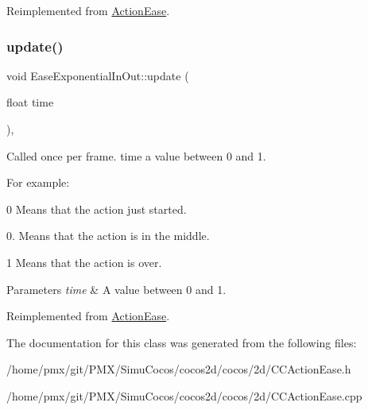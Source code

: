 Reimplemented from \hyperlink{classActionEase_ab99eb083fa033fae1d6c948fdc730782}{Action\+Ease}.

\mbox{\label{classEaseExponentialInOut_a856f7d0224d0ae8055b4a91a1538ce73}} 
\subsubsection{\texorpdfstring{update()}{update()}}
{\footnotesize\ttfamily void Ease\+Exponential\+In\+Out\+::update (\begin{DoxyParamCaption}\item[{float}]{time }\end{DoxyParamCaption})\hspace{0.3cm}{\ttfamily [override]}, {\ttfamily [virtual]}}

Called once per frame. time a value between 0 and 1.

For example\+:
\begin{DoxyItemize}
\item 0 Means that the action just started.
\item 0. Means that the action is in the middle.
\item 1 Means that the action is over.
\end{DoxyItemize}


\begin{DoxyParams}{Parameters}
{\em time} & A value between 0 and 1. \\
\hline
\end{DoxyParams}


Reimplemented from \hyperlink{classActionEase_a77679f09c02cf75fb54776470c339fc5}{Action\+Ease}.



The documentation for this class was generated from the following files\+:\begin{DoxyCompactItemize}
\item 
/home/pmx/git/\+P\+M\+X/\+Simu\+Cocos/cocos2d/cocos/2d/C\+C\+Action\+Ease.\+h\item 
/home/pmx/git/\+P\+M\+X/\+Simu\+Cocos/cocos2d/cocos/2d/C\+C\+Action\+Ease.\+cpp\end{DoxyCompactItemize}
